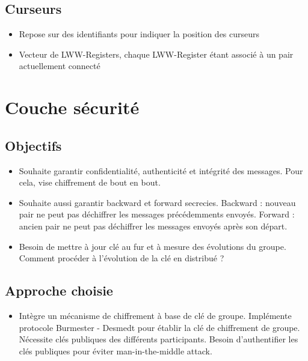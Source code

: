 \documentclass[12pt]{thesul}
\begin{document}
\subsection{Curseurs}

\begin{itemize}
  \item Repose sur des identifiants pour indiquer la position des curseurs
  \item Vecteur de LWW-Registers, chaque LWW-Register étant associé à un pair actuellement connecté
\end{itemize}

\section{Couche sécurité}

\subsection{Objectifs}

\begin{itemize}
  \item Souhaite garantir confidentialité, authenticité et intégrité des messages.
    Pour cela, vise chiffrement de bout en bout.
  \item Souhaite aussi garantir backward et forward secrecies.
    Backward : nouveau pair ne peut pas déchiffrer les messages précédemments envoyés.
    Forward : ancien pair ne peut pas déchiffrer les messages envoyés après son départ.
  \item Besoin de mettre à jour clé au fur et à mesure des évolutions du groupe.
    Comment procéder à l'évolution de la clé en distribué ?
\end{itemize}

\subsection{Approche choisie}

\begin{itemize}
  \item Intègre un mécanisme de chiffrement à base de clé de groupe.
    Implémente protocole Burmester - Desmedt pour établir la clé de chiffrement de groupe.
    Nécessite clés publiques des différents participants.
    Besoin d'authentifier les clés publiques pour éviter man-in-the-middle attack.
\end{itemize}
\end{document}
